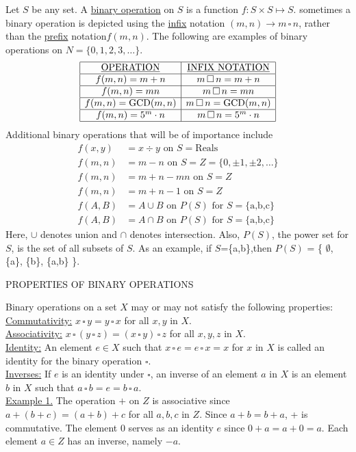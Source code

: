 \documentclass[12pt]{article}
\theoremstyle{definition}
\begin{document}
Let $S$ be any set.  A \underline{binary operation} on $S$ is  a function $f:S\times S\mapsto S$.  sometimes a binary operation is depicted using the \underline{infix} notation $(m,n)\rightarrow m\,\square\, n$, rather than the \underline{prefix} notation$f(m,n)$.  The following are examples of binary operations on $N=\{0,1,2,3,\dots\}$.\\
$$\begin{array}{|c|c|}
\hline
\underline{\text{OPERATION}}&\underline{\text{INFIX NOTATION}}\\
\hline
f(m,n)=m+n & m\,\square\, n=m+n\\
\hline
f(m,n)=mn & m\,\square\, n=mn\\
\hline
f(m,n)=\text{GCD}(m,n) & m\,\square\, n=\text{GCD}(m,n)\\
\hline
f(m,n)=5^m\cdot n & m\,\square\, n=5^m\cdot n\\
\hline
\end{array}$$
Additional binary operations that will be of importance include
\begin{equation*}\begin{split}
f(x,y)&= x\div y \text{ on }S=\text{Reals}\\
f(m,n)& = m-n \text{ on } S=Z=\{0,\pm1,\pm2,\dots\}\\
f(m,n)&=m+n-mn \text{ on }S=Z\\
f(m,n)&=m+n-1 \text{ on }S=Z\\
f(A,B)&=A\cup B \text{ on } P(S) \text{ for }S=\{\text{a,b,c}\}\\
f(A,B)&=A\cap B \text{ on } P(S) \text{ for }S=\{\text{a,b,c}\}
\end{split}\end{equation*}
Here, $\cup$ denotes union and $\cap$ denotes intersection.  Also, $P(S)$, the power set for $S$, is the set of all subsets of $S$.  As an example, if $S$=\{a,b\},then $P(S)$ = \{ $\emptyset$, \{a\}, \{b\}, \{a,b\} \}.\\[.1in]
\newpage
\centerline{PROPERTIES OF BINARY OPERATIONS}

Binary operations on a set $X$ may or may not satisfy the following properties:\\
\underline{Commutativity:} $x\,\square\, y =y\,\square\, x$ for all $x,y$ in $X$.\\
\underline{Associativity:} $x\,\square\,(y\,\square\, z)=(x\,\square\, y)\,\square\, z$ for all $x,y,z$ in $X$.\\
\underline{Identity:} An element $e\in X$ such that $x\,\square\, e=e\,\square\, x = x$ for $x$ in $X$ is called an identity for the binary operation $\square$.\\
\underline{Inverses:} If $e$ is an identity under $\square$, an inverse of an element $a$ in $X$ is an element $b$ in $X$ such that $a\,\square\, b=e=b\,\square\, a$.\\
\underline{Example 1.}  The operation $+$ on $Z$ is associative since $a+(b+c)=(a+b)+c$ for all $a,b,c$ in $Z$.  Since $a+b=b+a$, + is commutative.  The element 0 serves as an identity $e$ since $0+a=a+0=a$.  Each element $a\in Z$ has an inverse, namely $-a$.\\[.1in]
\end{document}
